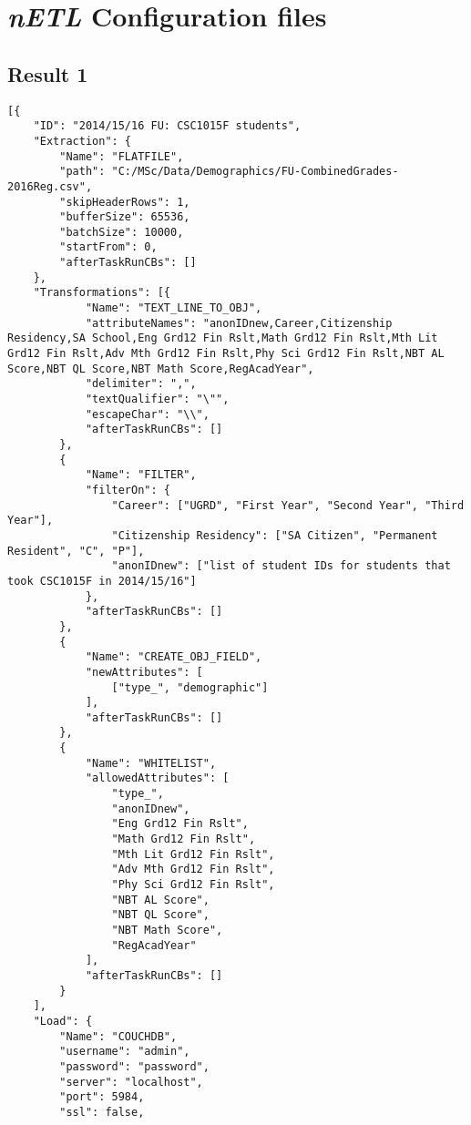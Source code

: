 \section{\textit{nETL} Configuration files}

\subsection{Result 1}
\label{netl-run1-config}
\begin{verbatim}
[{
    "ID": "2014/15/16 FU: CSC1015F students",
    "Extraction": {
        "Name": "FLATFILE",
        "path": "C:/MSc/Data/Demographics/FU-CombinedGrades-2016Reg.csv",
        "skipHeaderRows": 1,
        "bufferSize": 65536,
        "batchSize": 10000,
        "startFrom": 0,
        "afterTaskRunCBs": []
    },
    "Transformations": [{
            "Name": "TEXT_LINE_TO_OBJ",
            "attributeNames": "anonIDnew,Career,Citizenship Residency,SA School,Eng Grd12 Fin Rslt,Math Grd12 Fin Rslt,Mth Lit Grd12 Fin Rslt,Adv Mth Grd12 Fin Rslt,Phy Sci Grd12 Fin Rslt,NBT AL Score,NBT QL Score,NBT Math Score,RegAcadYear",
            "delimiter": ",",
            "textQualifier": "\"",
            "escapeChar": "\\",
            "afterTaskRunCBs": []
        },
        {
            "Name": "FILTER",
            "filterOn": {
                "Career": ["UGRD", "First Year", "Second Year", "Third Year"],
                "Citizenship Residency": ["SA Citizen", "Permanent Resident", "C", "P"],
                "anonIDnew": ["list of student IDs for students that took CSC1015F in 2014/15/16"]
            },
            "afterTaskRunCBs": []
        },
        {
            "Name": "CREATE_OBJ_FIELD",
            "newAttributes": [
                ["type_", "demographic"]
            ],
            "afterTaskRunCBs": []
        },
        {
            "Name": "WHITELIST",
            "allowedAttributes": [
                "type_",
                "anonIDnew",
                "Eng Grd12 Fin Rslt",
                "Math Grd12 Fin Rslt",
                "Mth Lit Grd12 Fin Rslt",
                "Adv Mth Grd12 Fin Rslt",
                "Phy Sci Grd12 Fin Rslt",
                "NBT AL Score",
                "NBT QL Score",
                "NBT Math Score",
                "RegAcadYear"
            ],
            "afterTaskRunCBs": []
        }
    ],
    "Load": {
        "Name": "COUCHDB",
        "username": "admin",
        "password": "password",
        "server": "localhost",
        "port": 5984,
        "ssl": false,

\end{verbatim}
